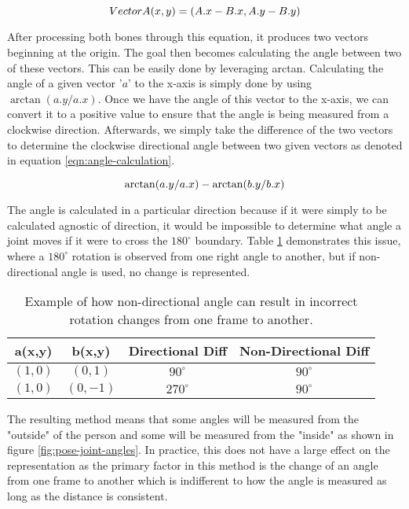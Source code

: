 \begin{equation}
	\label{eqn:angle-centering}
	\centering
	VectorA(x,y) = (A.x - B.x, A.y - B.y)
\end{equation}

After processing both bones through this equation, it produces two vectors beginning at the origin. The goal then becomes calculating the angle between two of these vectors. This can be easily done by leveraging arctan. Calculating the angle of a given vector '$a$' to the x-axis is simply done by using $\arctan(a.y/a.x)$. Once we have the angle of this vector to the x-axis, we can convert it to a positive value to ensure that the angle is being measured from a clockwise direction. Afterwards, we simply take the difference of the two vectors to determine the clockwise directional angle between two given vectors as denoted in equation \ref{eqn:angle-calculation}.

\begin{equation}
	\label{eqn:angle-calculation}
	\centering
	\arctan(a.y/a.x) - \arctan(b.y/b.x)
\end{equation}

The angle is calculated in a particular direction because if it were simply to be calculated agnostic of direction, it would be impossible to determine what angle a joint moves if it were to cross the $180^\circ$ boundary. Table \ref{tab:directed-angle-example} demonstrates this issue, where a $180^\circ$ rotation is observed from one right angle to another, but if non-directional angle is used, no change is represented.

\begin{table}[ht]
	\centering
	\begin{tabular}{||c c c c||} 
		\hline
		\textbf{a(x,y)} & \textbf{b(x,y)} & \textbf{Directional Diff} & \textbf{Non-Directional Diff} \\ [0.5ex] 
		\hline\hline
		$(1,0)$ & $(0,1)$ & $90^\circ$ & $90^\circ$ \\
		\hline
		$(1,0)$ & $(0,-1)$ & $270^\circ$ & $90^\circ$ \\
		\hline
	\end{tabular}
	\caption{Example of how non-directional angle can result in incorrect rotation changes from one frame to another.}
	\label{tab:directed-angle-example}
\end{table}

The resulting method means that some angles will be measured from the "outside" of the person and some will be measured from the "inside" as shown in figure \ref{fig:pose-joint-angles}. In practice, this does not have a large effect on the representation as the primary factor in this method is the change of an angle from one frame to another which is indifferent to how the angle is measured as long as the distance is consistent.


